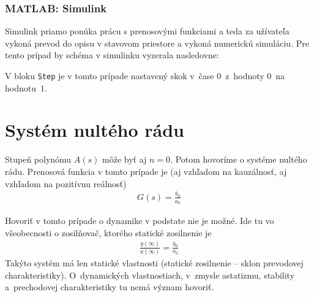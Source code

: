 \documentclass[a4paper, 10pt, ]{article}
\begin{document}
\subsubsection{MATLAB: Simulink}

Simulink priamo ponúka prácu s prenosovými funkciami a teda za užívateľa vykoná prevod do opisu v stavovom priestore a vykoná numerickú simuláciu. Pre tento prípad by schéma v simulinku vyzerala nasledovne:

\begin{center}


    \vspace{-5mm}

	\label{sim_PCHSS1R}

    \vspace{-1mm}

\end{center}

V bloku \lstinline|Step| je v tomto prípade nastavený skok v~čase $0$~z~hodnoty $0$~na hodnotu~$1$.

























\section{Systém nultého rádu}

Stupeň polynómu $A(s)$ môže byť aj $n = 0$. Potom hovoríme o systéme nultého rádu. Prenosová funkcia v tomto prípade je (aj vzhľadom na kauzálnosť, aj vzhľadom na pozitívnu reálnosť)
\begin{align}
    G(s) = \frac{b_0}{a_0}
\end{align}

Hovoriť v tomto prípade o dynamike v podstate nie je možné. Ide tu vo všeobecnosti o zosilňovač, ktorého statické zosilnenie je
\begin{align}
    \frac{y(\infty)}{u(\infty)} = \frac{b_0 }{a_0}
\end{align}
Takýto systém má len statické vlastnosti (statické zosilnenie -- sklon prevodovej charakteristiky). O~dynamických vlastnostiach, v~zmysle astatizmu, stability a~prechodovej charakteristiky tu nemá význam hovoriť.
\end{document}
